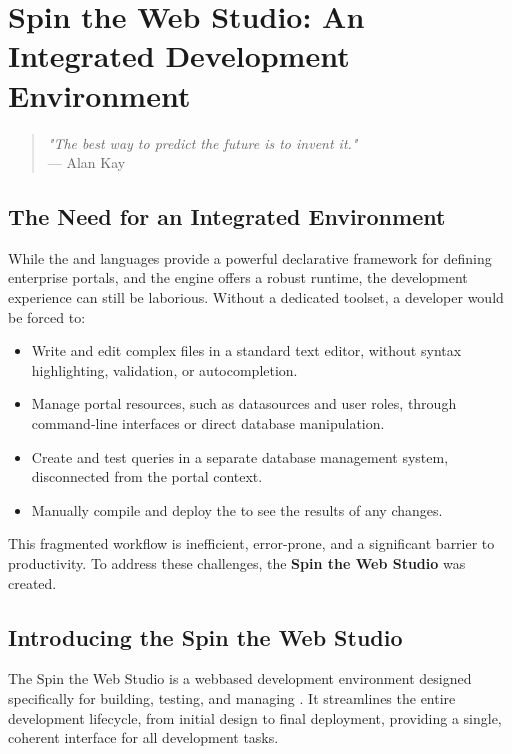 \chapter{Spin the Web Studio: An Integrated Development Environment}
\label{chap:studio}

\begin{quote}
\textit{"The best way to predict the future is to invent it."} \\
— Alan Kay
\end{quote}

\section{The Need for an Integrated Environment}
\label{sec:studio-need}

While the \wbdl{} and \wbpl{} languages provide a powerful declarative framework for defining enterprise portals, and the \webspinner{} engine offers a robust runtime, the development experience can still be laborious. Without a dedicated toolset, a developer would be forced to:

\begin{itemize}
    \item Write and edit complex \wbdl{} files in a standard text editor, without syntax highlighting, validation, or autocompletion.
    \item Manage portal resources, such as datasources and user roles, through command-line interfaces or direct database manipulation.
    \item Create and test \wbpl{} queries in a separate database management system, disconnected from the portal context.
    \item Manually compile and deploy the \webbase{} to see the results of any changes.
\end{itemize}

This fragmented workflow is inefficient, error-prone, and a significant barrier to productivity. To address these challenges, the \textbf{Spin the Web Studio} was created.

\section{Introducing the Spin the Web Studio}
\label{sec:studio-intro}

The Spin the Web Studio is a webbased development environment designed specifically for building, testing, and managing . It streamlines the entire development lifecycle, from initial design to final deployment, providing a single, coherent interface for all development tasks.

